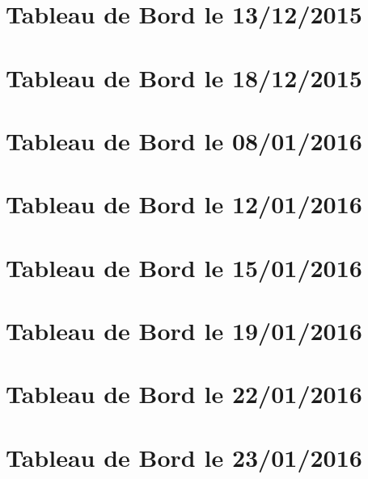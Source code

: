 \begin{appendices}

\chapter{Tableau de Bord le 13/12/2015}


\chapter{Tableau de Bord le 18/12/2015}


\chapter{Tableau de Bord le 08/01/2016}


\chapter{Tableau de Bord le 12/01/2016}


\chapter{Tableau de Bord le 15/01/2016}


\chapter{Tableau de Bord le 19/01/2016}


\chapter{Tableau de Bord le 22/01/2016}


\chapter{Tableau de Bord le 23/01/2016}


\end{appendices}


